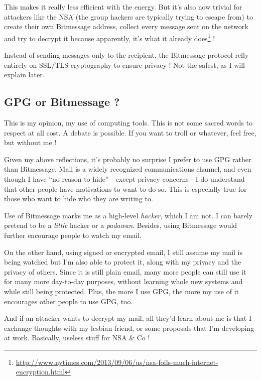 This makes it really less efficient with the energy. But it's also now trivial for attackers like the NSA (the group hackers are typically
trying to escape from) to create their own Bitmessage address, collect every message sent on the network and try to decrypt it because
apparently, it's what it already does\footnote{\url{http://www.nytimes.com/2013/09/06/us/nsa-foils-much-internet-encryption.html}} !

Instead of sending messages only to the recipient, the Bitmessage protocol relly entirely on SSL/TLS cryptography to ensure privacy ! Not
the safest, as I will explain later.

\subsection{GPG or Bitmessage ?}\label{gpg-or-bitmessage}

\begin{notice}
	This is my opinion, my use of computing tools. This is not some sacred words to respect at all cost. A debate is possible. If you want
	to troll or whatever, feel free, but without me !
\end{notice}

Given my above reflections, it's probably no surprise I prefer to use
GPG rather than Bitmessage. Mail is a widely recognized communications
channel, and even though I have ``no reason to hide'' - except privacy
concerns - I do understand that other people have motivations to want to
do so. This is especially true for those who want to hide who they are
writing to.

Use of Bitmessage marks me as a high-level \emph{hacker}, which I am not. I can barely pretend to be a \emph{little} hacker or a
\emph{padawan}. Besides, using Bitmessage would further encourage people to watch my email.

On the other hand, using signed or encrypted email, I still assume my
mail is being watched but I'm also able to protect it, along with my
privacy and the privacy of others. Since it is still plain email, many
more people can still use it for many more day-to-day purposes, without
learning whole new systems and while still being protected. Plus, the
more I use GPG, the more my use of it encourages other people to use
GPG, too.

And if an attacker wants to decrypt my mail, all they'd learn about me
is that I exchange thoughts with my lesbian friend, or some proposals
that I'm developing at work. Basically, useless stuff for NSA \& Co !

